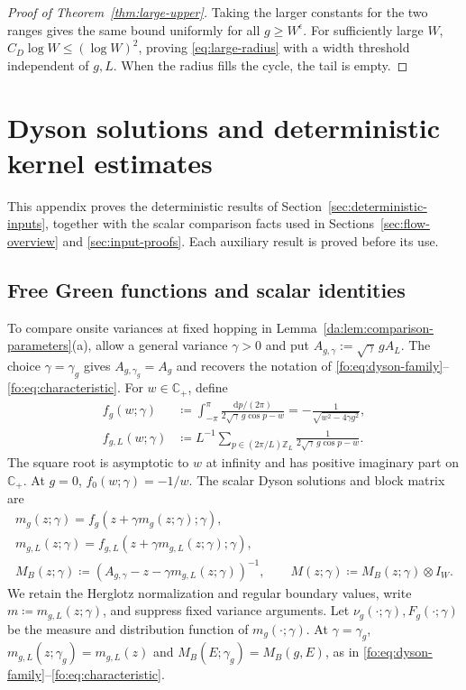 \documentclass[11pt]{article}
\numberwithin{equation}{section}
\theoremstyle{remark}
\newcommand{\Z}{\mathbb Z}
\newcommand{\C}{\mathbb C}
\begin{document}
\begin{proof}[Proof of Theorem~\ref{thm:large-upper}]
Taking the larger constants for the two ranges gives the same bound
uniformly for all $g\ge W^\epsilon$. For sufficiently large $W$,
$C_D\log W\le(\log W)^2$, proving \eqref{eq:large-radius} with a
width threshold independent of $g,L$. When the radius fills the cycle,
the tail is empty.
\end{proof}

\appendix
\section{Dyson solutions and deterministic kernel estimates}
\label{app:dyson-foundations}\label{app:deterministic}
This appendix proves the deterministic results of
Section~\ref{sec:deterministic-inputs}, together with the scalar
comparison facts used in Sections~\ref{sec:flow-overview} and
\ref{sec:input-proofs}. Each auxiliary result is proved before its use.

\subsection{Free Green functions and scalar identities}
\label{app:dyson-common}
To compare onsite variances at fixed hopping in
Lemma~\ref{da:lem:comparison-parameters}(a), allow a general variance
$\gamma>0$ and put $A_{g,\gamma}:=\sqrt\gamma\,gA_L$. The choice
$\gamma=\gamma_g$ gives $A_{g,\gamma_g}=A_g$ and recovers the notation of
\eqref{fo:eq:dyson-family}--\eqref{fo:eq:characteristic}.
For $w\in\C_+$, define
\begin{equation}\label{bl:eq:physical}
 \begin{split}
 f_g(w;\gamma)&\coloneqq \int_{-\pi}^{\pi}
       \frac{\mathrm dp/(2\pi)}{2\sqrt\gamma\,g\cos p-w}
       =-\frac1{\sqrt{w^2-4\gamma g^2}},\\
 f_{g,L}(w;\gamma)&\coloneqq L^{-1}\sum_{p\in(2\pi/L)\Z_L}
                   \frac1{2\sqrt\gamma\,g\cos p-w}.
 \end{split}
\end{equation}
The square root is asymptotic to $w$ at infinity and has positive
imaginary part on $\C_+$. At $g=0$, $f_0(w;\gamma)=-1/w$.
The scalar Dyson solutions and block matrix are
\begin{equation}\label{da:eq:dyson}
 \begin{gathered}
 m_g(z;\gamma)=f_g(z+\gamma m_g(z;\gamma);\gamma),\\
 m_{g,L}(z;\gamma)=f_{g,L}(z+\gamma m_{g,L}(z;\gamma);\gamma),\\
 M_B(z;\gamma)\coloneqq (A_{g,\gamma}-z-\gamma m_{g,L}(z;\gamma))^{-1},\qquad
 M(z;\gamma)\coloneqq M_B(z;\gamma)\otimes I_W.
 \end{gathered}
\end{equation}
We retain the Herglotz normalization and regular boundary values, write
$m\coloneqq m_{g,L}(z;\gamma)$, and suppress fixed variance arguments.
Let $\nu_g(\cdot;\gamma),F_g(\cdot;\gamma)$ be the measure and distribution
function of $m_g(\cdot;\gamma)$. At $\gamma=\gamma_g$,
$m_{g,L}(z;\gamma_g)=m_{g,L}(z)$ and $M_B(E;\gamma_g)=M_B(g,E)$,
as in
\eqref{fo:eq:dyson-family}--\eqref{fo:eq:characteristic}.
\end{document}
